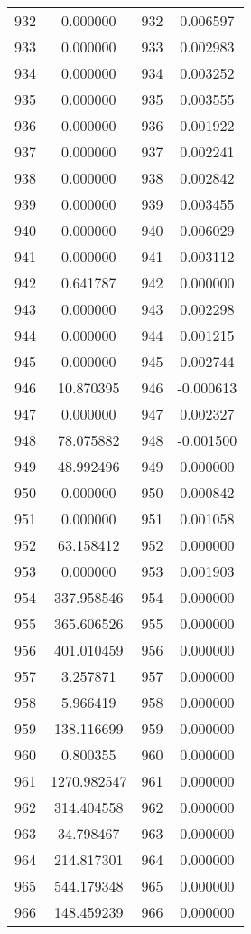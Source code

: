 \documentclass[12pt]{article}
\begin{document}
\begin{longtable}{@{}cccc@{}}
932 & 0.000000 & 932 & 0.006597 \\
933 & 0.000000 & 933 & 0.002983 \\
934 & 0.000000 & 934 & 0.003252 \\
935 & 0.000000 & 935 & 0.003555 \\
936 & 0.000000 & 936 & 0.001922 \\
937 & 0.000000 & 937 & 0.002241 \\
938 & 0.000000 & 938 & 0.002842 \\
939 & 0.000000 & 939 & 0.003455 \\
940 & 0.000000 & 940 & 0.006029 \\
941 & 0.000000 & 941 & 0.003112 \\
942 & 0.641787 & 942 & 0.000000 \\
943 & 0.000000 & 943 & 0.002298 \\
944 & 0.000000 & 944 & 0.001215 \\
945 & 0.000000 & 945 & 0.002744 \\
946 & 10.870395 & 946 & -0.000613 \\
947 & 0.000000 & 947 & 0.002327 \\
948 & 78.075882 & 948 & -0.001500 \\
949 & 48.992496 & 949 & 0.000000 \\
950 & 0.000000 & 950 & 0.000842 \\
951 & 0.000000 & 951 & 0.001058 \\
952 & 63.158412 & 952 & 0.000000 \\
953 & 0.000000 & 953 & 0.001903 \\
954 & 337.958546 & 954 & 0.000000 \\
955 & 365.606526 & 955 & 0.000000 \\
956 & 401.010459 & 956 & 0.000000 \\
957 & 3.257871 & 957 & 0.000000 \\
958 & 5.966419 & 958 & 0.000000 \\
959 & 138.116699 & 959 & 0.000000 \\
960 & 0.800355 & 960 & 0.000000 \\
961 & 1270.982547 & 961 & 0.000000 \\
962 & 314.404558 & 962 & 0.000000 \\
963 & 34.798467 & 963 & 0.000000 \\
964 & 214.817301 & 964 & 0.000000 \\
965 & 544.179348 & 965 & 0.000000 \\
966 & 148.459239 & 966 & 0.000000 \\

\end{longtable}
\end{document}
